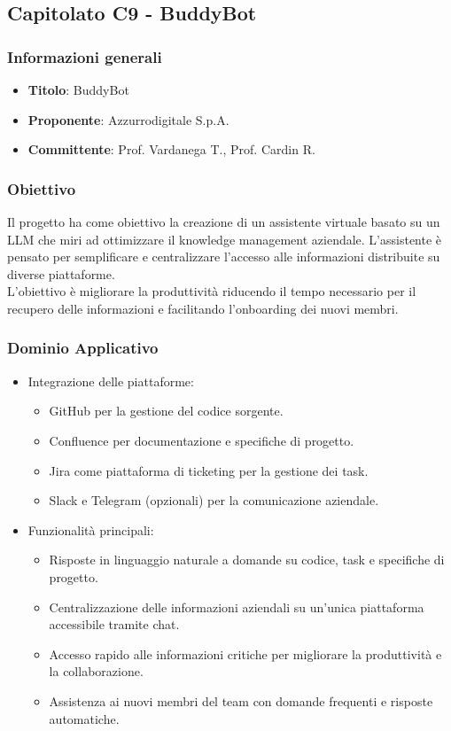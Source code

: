 \subsection{Capitolato C9 - BuddyBot}
     \subsubsection{Informazioni generali}
        \begin{itemize}
            \item \textbf{Titolo}: BuddyBot
            \item \textbf{Proponente}: Azzurrodigitale S.p.A.
            \item \textbf{Committente}: Prof. Vardanega T., Prof. Cardin R.
        \end{itemize}
    \subsubsection{Obiettivo}
    Il progetto ha come obiettivo la creazione di un assistente virtuale basato su un LLM che miri ad ottimizzare il knowledge management aziendale. L’assistente è pensato per semplificare e centralizzare l’accesso alle informazioni distribuite su diverse  piattaforme.\\
    L’obiettivo è migliorare la produttività riducendo il tempo necessario per il recupero delle informazioni e facilitando l’onboarding dei nuovi membri.
     \subsubsection{Dominio Applicativo}
    \begin{itemize}
        \item Integrazione delle piattaforme:
        \begin{itemize}
            \item GitHub per la gestione del codice sorgente.
            \item Confluence per documentazione e specifiche di progetto.
            \item Jira come piattaforma di ticketing per la gestione dei task.
            \item Slack e Telegram (opzionali) per la comunicazione aziendale.
        \end{itemize}
        \item Funzionalità principali:
        \begin{itemize}
            \item Risposte in linguaggio naturale a domande su codice, task e specifiche di progetto.
            \item Centralizzazione delle informazioni aziendali su un’unica piattaforma accessibile tramite chat.
            \item Accesso rapido alle informazioni critiche per migliorare la produttività e la collaborazione.
            \item Assistenza ai nuovi membri del team con domande frequenti e risposte automatiche.
        \end{itemize}
    \end{itemize}
